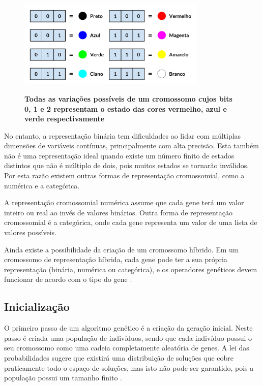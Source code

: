\documentclass[12pt,oneside,a4paper,english,french,spanish,brazil,]{abntex2}
\begin{document}
\begin{figure}[ht]
\centering
\caption{\textbf{Todas as variações possíveis de um cromossomo cujos bits 0, 1 e 2 representam o estado das cores vermelho, azul e verde respectivamente}}
\includegraphics[width=0.8\textwidth]{imagens/GA_Cromossomo_RGB.pdf}
\sourceAuthor	
\label{fig:GA_Cromossomo_RGB}
\end{figure}

No entanto, a representação binária tem dificuldades ao lidar com múltiplas dimensões de variáveis contínuas, principalmente com alta precisão. Esta também não é uma representação ideal quando existe um número finito de estados distintos que não é múltiplo de dois, pois muitos estados se tornarão inválidos. Por esta razão existem outras formas de representação cromossomial, como a numérica e a categórica.

A representação cromossomial numérica assume que cada gene terá um valor inteiro ou real ao invés de valores binários. Outra forma de representação cromossomial é a categórica, onde cada gene representa um valor de uma lista de valores possíveis.

Ainda existe a possibilidade da criação de um cromossomo híbrido. Em um cromossomo de representação híbrida, cada gene pode ter a sua própria representação (binária, numérica ou categórica), e os operadores genéticos devem funcionar de acordo com o tipo do gene \cite{linden:2008}.

\subsection{Inicialização}

O primeiro passo de um algoritmo genético é a criação da geração inicial. Neste passo é criada uma população de indivíduos, sendo que cada indivíduo possui o seu cromossomo como uma cadeia completamente aleatória de genes. A lei das probabilidades sugere que existirá uma distribuição de soluções que cobre praticamente todo o espaço de soluções, mas isto não pode ser garantido, pois a população possui um tamanho finito \cite{linden:2008}.
\end{document}
